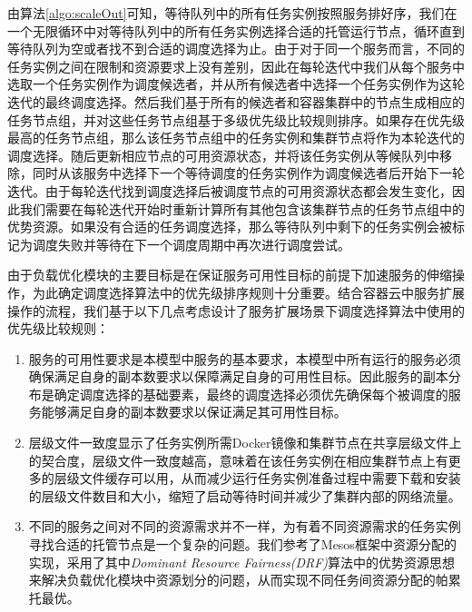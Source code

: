 由算法\ref{algo:scaleOut}可知，等待队列中的所有任务实例按照服务排好序，我们在一个无限循环中对等待队列中的所有任务实例选择合适的托管运行节点，循环直到等待队列为空或者找不到合适的调度选择为止。由于对于同一个服务而言，不同的任务实例之间在限制和资源要求上没有差别，因此在每轮迭代中我们从每个服务中选取一个任务实例作为调度候选者，并从所有候选者中选择一个任务实例作为这轮迭代的最终调度选择。然后我们基于所有的候选者和容器集群中的节点生成相应的任务节点组，并对这些任务节点组基于多级优先级比较规则排序。如果存在优先级最高的任务节点组，那么该任务节点组中的任务实例和集群节点将作为本轮迭代的调度选择。随后更新相应节点的可用资源状态，并将该任务实例从等候队列中移除，同时从该服务中选择下一个等待调度的任务实例作为调度候选者后开始下一轮迭代。由于每轮迭代找到调度选择后被调度节点的可用资源状态都会发生变化，因此我们需要在每轮迭代开始时重新计算所有其他包含该集群节点的任务节点组中的优势资源。如果没有合适的任务调度选择，那么等待队列中剩下的任务实例会被标记为调度失败并等待在下一个调度周期中再次进行调度尝试。

由于负载优化模块的主要目标是在保证服务可用性目标的前提下加速服务的伸缩操作，为此确定调度选择算法中的优先级排序规则十分重要。结合容器云中服务扩展操作的流程，我们基于以下几点考虑设计了服务扩展场景下调度选择算法中使用的优先级比较规则：
\begin{enumerate}
\item 服务的可用性要求是本模型中服务的基本要求，本模型中所有运行的服务必须确保满足自身的副本数要求以保障满足自身的可用性目标。因此服务的副本分布是确定调度选择的基础要素，最终的调度选择必须优先确保每个被调度的服务能够满足自身的副本数要求以保证满足其可用性目标。
\item 层级文件一致度显示了任务实例所需Docker镜像和集群节点在共享层级文件上的契合度，层级文件一致度越高，意味着在该任务实例在相应集群节点上有更多的层级文件缓存可以用，从而减少运行任务实例准备过程中需要下载和安装的层级文件数目和大小，缩短了启动等待时间并减少了集群内部的网络流量。
\item 不同的服务之间对不同的资源需求并不一样，为有着不同资源需求的任务实例寻找合适的托管节点是一个复杂的问题。我们参考了Mesos框架中资源分配的实现，采用了其中\emph{Dominant Resource Fairness(DRF)}算法中的优势资源思想来解决负载优化模块中资源划分的问题，从而实现不同任务间资源分配的帕累托最优\cite{ghodsi2011dominant}。
\end{enumerate}

